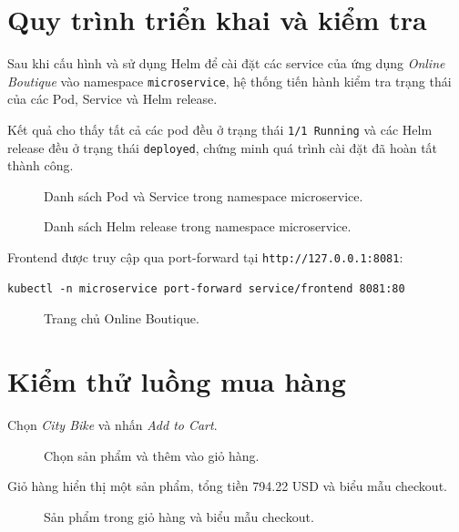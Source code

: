 \section{Quy trình triển khai và kiểm tra}

Sau khi cấu hình và sử dụng Helm để cài đặt các service của ứng dụng \textit{Online Boutique} vào namespace \texttt{microservice}, hệ thống tiến hành kiểm tra trạng thái của các Pod, Service và Helm release. 

Kết quả cho thấy tất cả các pod đều ở trạng thái \texttt{1/1 Running} và các Helm release đều ở trạng thái \texttt{deployed}, chứng minh quá trình cài đặt đã hoàn tất thành công.

\begin{figure}[H]
  \centering
  \caption{Danh sách Pod và Service trong namespace microservice.}
\end{figure}

\begin{figure}[H]
  \centering
  \caption{Danh sách Helm release trong namespace microservice.}
\end{figure}

Frontend được truy cập qua port-forward tại \texttt{http://127.0.0.1:8081}:

\begin{verbatim}
kubectl -n microservice port-forward service/frontend 8081:80
\end{verbatim}

\begin{figure}[H]
  \centering
  \caption{Trang chủ Online Boutique.}
\end{figure}

\section{Kiểm thử luồng mua hàng}

Chọn \textit{City Bike} và nhấn \textit{Add to Cart}.

\begin{figure}[H]
  \centering
  \caption{Chọn sản phẩm và thêm vào giỏ hàng.}
\end{figure}

Giỏ hàng hiển thị một sản phẩm, tổng tiền 794.22 USD và biểu mẫu checkout.

\begin{figure}[H]
  \centering
  \caption{Sản phẩm trong giỏ hàng và biểu mẫu checkout.}
\end{figure}

